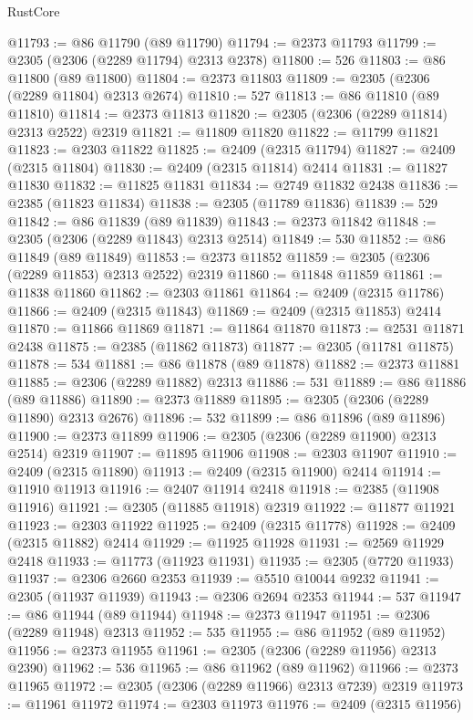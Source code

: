 \begin{lexlean}{RustCore}
\begin{coremodule}
@11793 := @86 @11790 (@89 @11790)
@11794 := @2373 @11793
@11799 := @2305 (@2306 (@2289 @11794) @2313 @2378)
@11800 := 526
@11803 := @86 @11800 (@89 @11800)
@11804 := @2373 @11803
@11809 := @2305 (@2306 (@2289 @11804) @2313 @2674)
@11810 := 527
@11813 := @86 @11810 (@89 @11810)
@11814 := @2373 @11813
@11820 := @2305 (@2306 (@2289 @11814) @2313 @2522) @2319
@11821 := @11809 @11820
@11822 := @11799 @11821
@11823 := @2303 @11822
@11825 := @2409 (@2315 @11794)
@11827 := @2409 (@2315 @11804)
@11830 := @2409 (@2315 @11814) @2414
@11831 := @11827 @11830
@11832 := @11825 @11831
@11834 := @2749 @11832 @2438
@11836 := @2385 (@11823 @11834)
@11838 := @2305 (@11789 @11836)
@11839 := 529
@11842 := @86 @11839 (@89 @11839)
@11843 := @2373 @11842
@11848 := @2305 (@2306 (@2289 @11843) @2313 @2514)
@11849 := 530
@11852 := @86 @11849 (@89 @11849)
@11853 := @2373 @11852
@11859 := @2305 (@2306 (@2289 @11853) @2313 @2522) @2319
@11860 := @11848 @11859
@11861 := @11838 @11860
@11862 := @2303 @11861
@11864 := @2409 (@2315 @11786)
@11866 := @2409 (@2315 @11843)
@11869 := @2409 (@2315 @11853) @2414
@11870 := @11866 @11869
@11871 := @11864 @11870
@11873 := @2531 @11871 @2438
@11875 := @2385 (@11862 @11873)
@11877 := @2305 (@11781 @11875)
@11878 := 534
@11881 := @86 @11878 (@89 @11878)
@11882 := @2373 @11881
@11885 := @2306 (@2289 @11882) @2313
@11886 := 531
@11889 := @86 @11886 (@89 @11886)
@11890 := @2373 @11889
@11895 := @2305 (@2306 (@2289 @11890) @2313 @2676)
@11896 := 532
@11899 := @86 @11896 (@89 @11896)
@11900 := @2373 @11899
@11906 := @2305 (@2306 (@2289 @11900) @2313 @2514) @2319
@11907 := @11895 @11906
@11908 := @2303 @11907
@11910 := @2409 (@2315 @11890)
@11913 := @2409 (@2315 @11900) @2414
@11914 := @11910 @11913
@11916 := @2407 @11914 @2418
@11918 := @2385 (@11908 @11916)
@11921 := @2305 (@11885 @11918) @2319
@11922 := @11877 @11921
@11923 := @2303 @11922
@11925 := @2409 (@2315 @11778)
@11928 := @2409 (@2315 @11882) @2414
@11929 := @11925 @11928
@11931 := @2569 @11929 @2418
@11933 := @11773 (@11923 @11931)
@11935 := @2305 (@7720 @11933)
@11937 := @2306 @2660 @2353
@11939 := @5510 @10044 @9232
@11941 := @2305 (@11937 @11939)
@11943 := @2306 @2694 @2353
@11944 := 537
@11947 := @86 @11944 (@89 @11944)
@11948 := @2373 @11947
@11951 := @2306 (@2289 @11948) @2313
@11952 := 535
@11955 := @86 @11952 (@89 @11952)
@11956 := @2373 @11955
@11961 := @2305 (@2306 (@2289 @11956) @2313 @2390)
@11962 := 536
@11965 := @86 @11962 (@89 @11962)
@11966 := @2373 @11965
@11972 := @2305 (@2306 (@2289 @11966) @2313 @7239) @2319
@11973 := @11961 @11972
@11974 := @2303 @11973
@11976 := @2409 (@2315 @11956)

\end{coremodule}
\end{lexlean}
